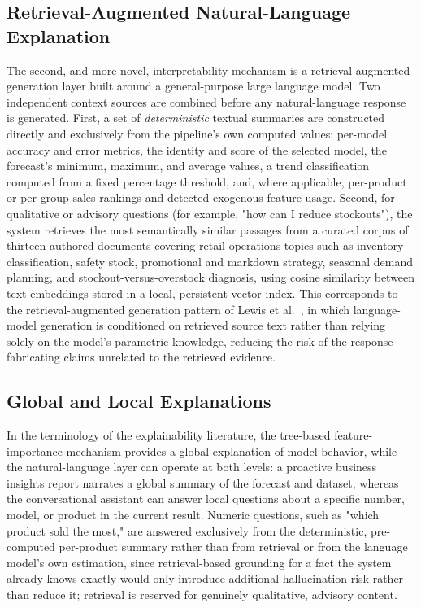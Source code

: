 \subsection{Retrieval-Augmented Natural-Language Explanation}
The second, and more novel, interpretability mechanism is a retrieval-augmented generation layer built around a general-purpose large language model. Two independent context sources are combined before any natural-language response is generated. First, a set of \emph{deterministic} textual summaries are constructed directly and exclusively from the pipeline's own computed values: per-model accuracy and error metrics, the identity and score of the selected model, the forecast's minimum, maximum, and average values, a trend classification computed from a fixed percentage threshold, and, where applicable, per-product or per-group sales rankings and detected exogenous-feature usage. Second, for qualitative or advisory questions (for example, "how can I reduce stockouts"), the system retrieves the most semantically similar passages from a curated corpus of thirteen authored documents covering retail-operations topics such as inventory classification, safety stock, promotional and markdown strategy, seasonal demand planning, and stockout-versus-overstock diagnosis, using cosine similarity between text embeddings stored in a local, persistent vector index. This corresponds to the retrieval-augmented generation pattern of Lewis et al.~\cite{lewis2020rag}, in which language-model generation is conditioned on retrieved source text rather than relying solely on the model's parametric knowledge, reducing the risk of the response fabricating claims unrelated to the retrieved evidence.

\subsection{Global and Local Explanations}
In the terminology of the explainability literature, the tree-based feature-importance mechanism provides a global explanation of model behavior, while the natural-language layer can operate at both levels: a proactive business insights report narrates a global summary of the forecast and dataset, whereas the conversational assistant can answer local questions about a specific number, model, or product in the current result. Numeric questions, such as "which product sold the most," are answered exclusively from the deterministic, pre-computed per-product summary rather than from retrieval or from the language model's own estimation, since retrieval-based grounding for a fact the system already knows exactly would only introduce additional hallucination risk rather than reduce it; retrieval is reserved for genuinely qualitative, advisory content.

